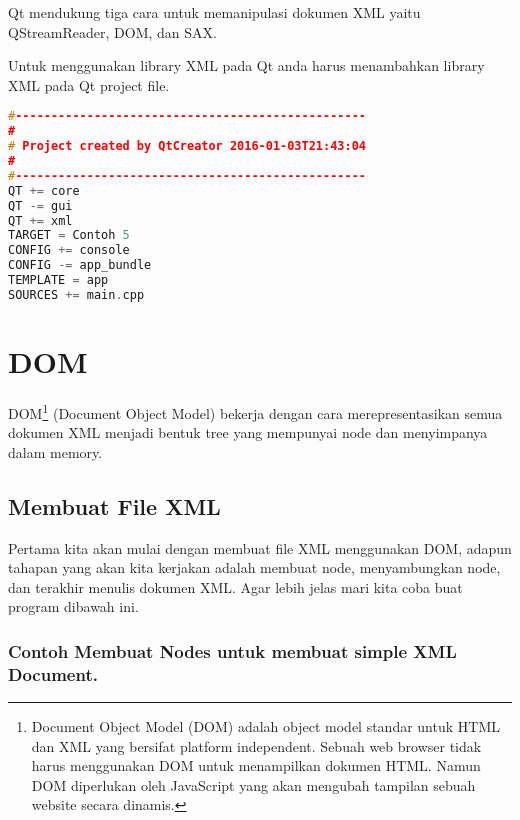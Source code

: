 Qt mendukung tiga cara untuk memanipulasi dokumen XML yaitu
QStreamReader, DOM, dan SAX.

Untuk menggunakan library XML pada Qt anda harus menambahkan library XML
pada Qt project file.

\begin{lstlisting}[language=c++]
#-------------------------------------------------
#
# Project created by QtCreator 2016-01-03T21:43:04
#
#-------------------------------------------------
QT += core
QT -= gui
QT += xml
TARGET = Contoh 5
CONFIG += console
CONFIG -= app_bundle
TEMPLATE = app
SOURCES += main.cpp
\end{lstlisting}

\section{DOM}\label{dom}

DOM\footnote{Document Object Model (DOM) adalah object model standar untuk HTML dan XML yang bersifat platform independent. Sebuah web browser tidak harus menggunakan DOM untuk menampilkan dokumen HTML. Namun DOM diperlukan oleh JavaScript yang akan mengubah tampilan sebuah website secara dinamis.} (Document Object Model) bekerja dengan cara merepresentasikan semua
dokumen XML menjadi bentuk tree yang mempunyai node dan menyimpanya
dalam memory.

\subsection{Membuat File XML}\label{membuat-file-xml}

Pertama kita akan mulai dengan membuat file XML menggunakan DOM, adapun
tahapan yang akan kita kerjakan adalah membuat node, menyambungkan node,
dan terakhir menulis dokumen XML. Agar lebih jelas mari kita coba buat
program dibawah ini.

\subsubsection*{Contoh  Membuat Nodes untuk membuat simple XML Document.}

